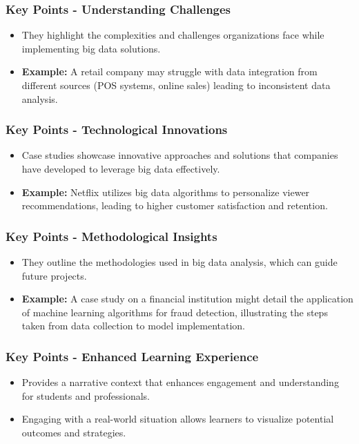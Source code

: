 \documentclass[aspectratio=169]{beamer}
\begin{document}
\begin{frame}[fragile]
    \frametitle{Key Points - Understanding Challenges}
    \begin{itemize}
        \item They highlight the complexities and challenges organizations face while implementing big data solutions.
        \item \textbf{Example:} A retail company may struggle with data integration from different sources (POS systems, online sales) leading to inconsistent data analysis.
    \end{itemize}
\end{frame}

\begin{frame}[fragile]
    \frametitle{Key Points - Technological Innovations}
    \begin{itemize}
        \item Case studies showcase innovative approaches and solutions that companies have developed to leverage big data effectively.
        \item \textbf{Example:} Netflix utilizes big data algorithms to personalize viewer recommendations, leading to higher customer satisfaction and retention.
    \end{itemize}
\end{frame}

\begin{frame}[fragile]
    \frametitle{Key Points - Methodological Insights}
    \begin{itemize}
        \item They outline the methodologies used in big data analysis, which can guide future projects.
        \item \textbf{Example:} A case study on a financial institution might detail the application of machine learning algorithms for fraud detection, illustrating the steps taken from data collection to model implementation.
    \end{itemize}
\end{frame}

\begin{frame}[fragile]
    \frametitle{Key Points - Enhanced Learning Experience}
    \begin{itemize}
        \item Provides a narrative context that enhances engagement and understanding for students and professionals.
        \item Engaging with a real-world situation allows learners to visualize potential outcomes and strategies.
    \end{itemize}
\end{frame}
\end{document}
